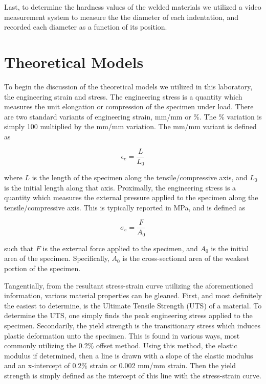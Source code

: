 \documentclass{article}
\begin{document}
Last, to determine the hardness values of the welded materials we utilized a video measurement system to measure the the diameter of each indentation, and recorded each diameter as a function of its position.

\newpage
\section{Theoretical Models}
To begin the discussion of the theoretical models we utilized in this laboratory, the engineering strain and stress. The engineering stress is a quantity which measures the unit elongation or compression of the specimen under load. There are two standard variants of engineering strain, mm/mm or \%. The \% variation is simply 100 multiplied by the  mm/mm variation. The mm/mm variant is defined as

\begin{equation}
    \epsilon_e = \frac{L}{L_0}
\end{equation}

where $L$ is the length of the specimen along the tensile/compressive  axis, and $L_0$ is the initial length along that axis. Proximally, the engineering stress is a quantity which measures the external pressure applied to the specimen along the tensile/compressive axis. This is typically reported in MPa, and is defined as

\begin{equation}
    \sigma_{e} = \frac{F}{A_{0}}
\end{equation}

such that $F$ is the external force applied to the specimen, and $A_0$ is the initial area of the specimen. Specifically, $A_0$ is the cross-sectional area of the weakest portion of the specimen. 

Tangentially, from the resultant stress-strain curve utilizing the aforementioned information, various material properties can be gleaned. First, and most definitely the easiest to determine, is the Ultimate Tensile Strength (UTS) of a material. To determine the UTS, one simply finds the peak engineering stress applied to the specimen. Secondarily, the yield strength is the transitionary stress which induces plastic deformation unto the specimen. This is found in various ways, most commonly utilizing the 0.2\% offset method. Using this method, the elastic modulus if determined, then a line is drawn with a slope of the elastic modulus and an x-intercept of 0.2\% strain or 0.002 mm/mm strain. Then the yield strength is simply defined as the intercept of this line with the stress-strain curve. 
\end{document}
